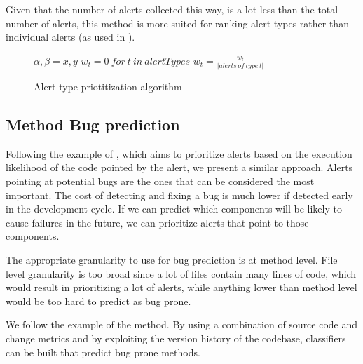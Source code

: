 Given that the number of alerts collected this way, is a lot less than the total number of alerts, this method is more suited for ranking alert types rather than individual alerts (as used in \cite{which_warnings}).

\begin{figure}[ht]
	\centering
	\begin{minipage}{.5\linewidth}
		\begin{algorithm}[H]
			\SetAlgoLined
			$\alpha, \beta = x, y$\;
			$w_t = 0 \ for \ t \ in \ alertTypes$\;
			$w_t = \frac{w_t}{|alerts \, of \, type \, t|}$
			\caption{Alert type priotitization algorithm}
		\end{algorithm}
	\end{minipage}
\end{figure}

\subsection{Method Bug prediction}

Following the example of \cite{static_profiling}, which aims to prioritize alerts based on the execution likelihood of the code pointed by the alert, we present a similar approach. Alerts pointing at potential bugs are the ones that can be considered the most important. The cost of detecting and fixing a bug is much lower if detected early in the development cycle. If we can predict which components will be likely to cause failures in the future, we can prioritize alerts that point to those components. 

The appropriate granularity to use for bug prediction is at method level. File level granularity is too broad since a lot of files contain many lines of code, which would result in prioritizing a lot of alerts, while anything lower than method level would be too hard to predict as bug prone.

We follow the example of the \cite{prediction_method} method. By using a combination of source code and change metrics and by exploiting the version history of the codebase, classifiers can be built that predict bug prone methods.

